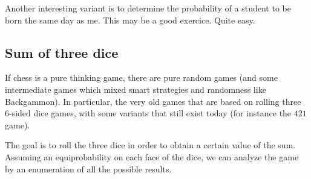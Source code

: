 {\Denis Another interesting variant is to determine the probability of a student to be born the same day as me. This may be a good exercice. Quite easy.}


\subsection{Sum of three dice}

If chess is a pure thinking game, there are pure random games
(and some intermediate games which mixed smart strategies and randomness like Backgammon).
In particular, the very old games that are based on rolling three 6-sided dice games,
with some variants that still exist today (for instance the $421$ game).

The goal is to roll the three dice in order to obtain a certain value of the sum.
Assuming an equiprobability on each face of the dice, we can analyze the game by an enumeration of all
the possible results. 

\bigskip

